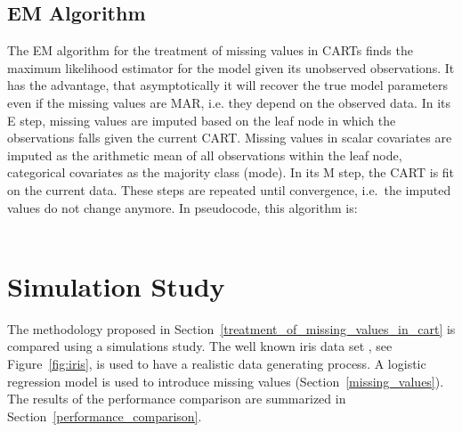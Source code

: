 \documentclass[12pt, twoside]{article}
\newcommand{\1}{\mathbb{1}}
\begin{document}
\subsection{EM Algorithm}\label{EM_for_CART}
The EM algorithm for the treatment of missing values in CARTs finds the maximum likelihood estimator for the model given its unobserved observations. It has the advantage, that asymptotically it will recover the true model parameters even if the missing values are MAR, i.e. they depend on the observed data.
In its E step, missing values are imputed based on the leaf node in which the observations falls given the current CART. Missing values in scalar covariates are imputed as the arithmetic mean of all observations within the leaf node, categorical covariates as the majority class (mode).
In its M step, the CART is fit on the current data. 
These steps are repeated until convergence, i.e.\ the imputed values do not change anymore. 
In pseudocode, this algorithm is:\\

\\

\section{Simulation Study}\label{simulation_study}
The methodology proposed in Section~\ref{treatment_of_missing_values_in_cart} is compared using a simulations study.
The well known iris data set \citep{iris}, see Figure~\ref{fig:iris}, is used to have a realistic data generating process. A logistic regression model is used to introduce missing values (Section~\ref{missing_values}). The results of the performance comparison are summarized in Section~\ref{performance_comparison}.
\end{document}
